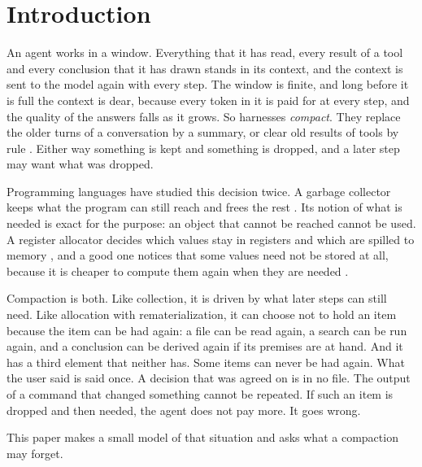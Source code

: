 \documentclass[acmsmall,nonacm,screen]{acmart}
\begin{document}
\section{Introduction}

An agent works in a window. Everything that it has read, every result of a tool and every
conclusion that it has drawn stands in its context, and the context is sent to the model
again with every step. The window is finite, and long before it is full the context is
dear, because every token in it is paid for at every step, and the quality of the answers
falls as it grows. So harnesses \emph{compact}. They replace the older turns of a
conversation by a summary, or clear old results of tools by rule
\citep{claudecompaction}. Either way something is kept and something is dropped, and a later
step may want what was dropped.

Programming languages have studied this decision twice. A garbage collector keeps what the
program can still reach and frees the rest \citep{McCarthy1960}. Its notion of what is
needed is exact for the purpose: an object that cannot be reached cannot be used. A register
allocator decides which values stay in registers and which are spilled to memory
\citep{Chaitin1982}, and a good one notices that some values need not be stored at all,
because it is cheaper to compute them again when they are needed \citep{Briggs1992}.

Compaction is both. Like collection, it is driven by what later steps can still need. Like
allocation with rematerialization, it can choose not to hold an item because the item can be
had again: a file can be read again, a search can be run again, and a conclusion can be
derived again if its premises are at hand. And it has a third element that neither has.
Some items can never be had again. What the user said is said once. A decision that was
agreed on is in no file. The output of a command that changed something cannot be repeated.
If such an item is dropped and then needed, the agent does not pay more. It goes wrong.

This paper makes a small model of that situation and asks what a compaction may forget.
\end{document}
